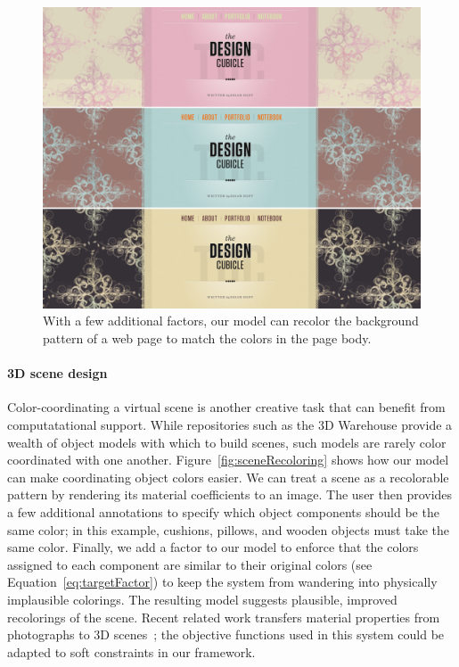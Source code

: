 \begin{figure}[ht]
\centering
\includegraphics[width=\columnwidth]{figs/webpageRecoloring}
\caption{With a few additional factors, our model can recolor the background pattern of a web page to match the colors in the page body.}
\label{fig:webpageRecoloring}
\vspace{-1.0em}
\end{figure}

\paragraph{3D scene design}
Color-coordinating a virtual scene is another creative task that can benefit from computatational support. While repositories such as the 3D Warehouse provide a wealth of object models with which to build scenes, such models are rarely color coordinated with one another. Figure~\ref{fig:sceneRecoloring} shows how our model can make coordinating object colors easier. We can treat a scene as a recolorable pattern by rendering its material coefficients to an image. The user then provides a few additional annotations to specify which object components should be the same color; in this example, cushions, pillows, and wooden objects must take the same color. Finally, we add a factor to our model to enforce that the colors assigned to each component are similar to their original colors (see Equation~\ref{eq:targetFactor}) to keep the system from wandering into physically implausible colorings. The resulting model suggests plausible, improved recolorings of the scene.
Recent related work transfers material properties from photographs to 3D scenes~\cite{MaterialStyleTransfer}; the objective functions used in this system could be adapted to soft constraints in our framework.


